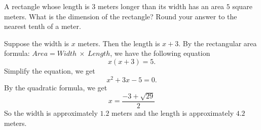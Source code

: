 


\edef\varx{\varx}

\edef\b{\b}



A rectangle whose length is $3$ meters longer than its width has an area $5$ square meters. What is the dimension of the rectangle? Round your answer to the nearest tenth of a meter.


\begin{solution}
 Suppose the width is $x$ meters. Then the length is $x+3$. By the rectangular area formula: $Area=Width~\times~Length$, we have the following equation
\[x(x+3)=5.\] 
Simplify the equation, we get
\[x^2+3x-5=0.\]
By the quadratic formula, we get  
\[x=\dfrac{-3+\sqrt{29}}{2}\]
So the width is approximately $1.2$ meters and the length is approximately $4.2$ meters.
\end{solution}